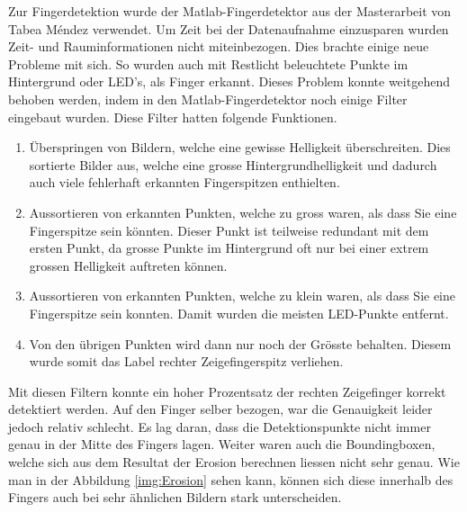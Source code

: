 Zur Fingerdetektion wurde der Matlab-Fingerdetektor aus der Masterarbeit von Tabea Méndez \cite{TabeasFingertracking} verwendet. 
Um Zeit bei der Datenaufnahme einzusparen wurden Zeit- und Rauminformationen nicht miteinbezogen. 
Dies brachte einige neue Probleme mit sich.   
So wurden auch mit Restlicht beleuchtete Punkte im Hintergrund oder LED's, als Finger erkannt.
Dieses Problem konnte weitgehend behoben werden, indem in den Matlab-Fingerdetektor noch einige Filter eingebaut wurden.
Diese Filter hatten folgende Funktionen.
\begin{enumerate}
\item Überspringen von Bildern, welche eine gewisse Helligkeit überschreiten. 
Dies sortierte Bilder aus, welche eine grosse Hintergrundhelligkeit und dadurch auch viele fehlerhaft erkannten Fingerspitzen enthielten.  
\item Aussortieren von erkannten Punkten, welche zu gross waren, als dass Sie eine Fingerspitze sein könnten. 
Dieser Punkt ist teilweise redundant mit dem ersten Punkt, da grosse Punkte im Hintergrund oft nur bei einer extrem grossen Helligkeit auftreten können.  
\item Aussortieren von erkannten Punkten, welche zu klein waren, als dass Sie eine Fingerspitze sein konnten. 
Damit wurden die meisten LED-Punkte entfernt.
\item Von den übrigen Punkten wird dann nur noch der Grösste behalten.
Diesem wurde somit das Label \grqq{}rechter Zeigefingerspitz\grqq{} verliehen. 
\end{enumerate}
Mit diesen Filtern konnte ein hoher Prozentsatz der rechten Zeigefinger korrekt detektiert werden.
Auf den Finger selber bezogen, war die Genauigkeit leider jedoch relativ schlecht.
Es lag daran, dass die Detektionspunkte nicht immer genau in der Mitte des Fingers lagen. 
Weiter waren auch die Boundingboxen, welche sich aus dem Resultat der Erosion \cite{TabeasFingertracking} berechnen liessen nicht sehr genau. 
Wie man in der Abbildung \ref{img:Erosion} sehen kann, können sich diese innerhalb des Fingers auch bei sehr ähnlichen Bildern stark unterscheiden.

